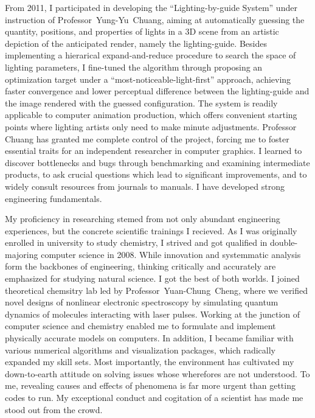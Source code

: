 \documentclass[a4paper, 12pt]{article}
\begin{document}
From 2011, I participated in developing the ``Lighting-by-guide System'' under instruction of Professor~Yung-Yu~Chuang, aiming at automatically guessing the quantity, positions, and properties of lights in a 3D scene from an artistic depiction of the anticipated render, namely the lighting-guide. Besides implementing a hierarical expand-and-reduce procedure to search the space of lighting parameters, I fine-tuned the algorithm through proposing an optimization target under a ``most-noticeable-light-first'' approach, achieving faster convergence and lower perceptual difference between the lighting-guide and the image rendered with the guessed configuration. The system is readily applicable to computer animation production, which offers convenient starting points where lighting artists only need to make minute adjustments. Professor Chuang has granted me complete control of the project, forcing me to foster essential traits for an independent researcher in computer graphics. I learned to discover bottlenecks and bugs through benchmarking and examining intermediate products, to ask crucial questions which lead to significant improvements, and to widely consult resources from journals to manuals. I have developed strong engineering fundamentals.


My proficiency in researching stemed from not only abundant engineering experiences, but the concrete scientific trainings I recieved. As I was originally enrolled in university to study chemistry, I strived and got qualified in double-majoring computer science in 2008. While innovation and systemmatic analysis form the backbones of engineering, thinking critically and accurately are emphasized for studying natural science. I got the best of both worlds. I joined theoretical chemsitry lab led by Professor~Yuan-Chung~Cheng, where we verified novel designs of nonlinear electronic spectroscopy by simulating quantum dynamics of molecules interacting with laser pulses. Working at the junction of computer science and chemistry enabled me to formulate and implement physically accurate models on computers. In addition, I became familiar with various numerical algorithms and visualization packages, which radically expanded my skill sets. Most importantly, the environment has cultivated my down-to-earth attitude on solving issues whose wherefores are not understood. To me, revealing causes and effects of phenomena is far more urgent than getting codes to run. My exceptional conduct and cogitation of a scientist has made me stood out from the crowd.
\end{document}
